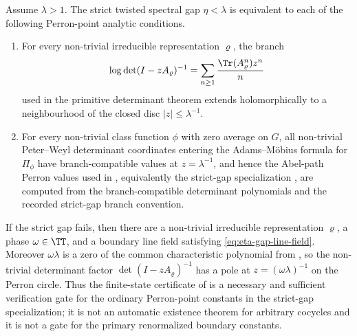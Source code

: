 \begin{proposition}
  \label{prop:eta-gap-perron-separation}
  Assume \(\lambda>1\).  The strict twisted spectral gap
  \(\eta<\lambda\) is equivalent to each of the following Perron-point
  analytic conditions.
  \begin{enumerate}[label=\textup{(\roman*)},leftmargin=*]
  \item For every non-trivial irreducible representation \(\varrho\), the
    branch
    \[
      \log\det(I-zA_\varrho)^{-1}
      =
      \sum_{n\ge1}\frac{\Tr(A_\varrho^n)z^n}{n}
    \]
    used in the primitive determinant theorem extends holomorphically to a neighbourhood of
    the closed disc \(|z|\le\lambda^{-1}\).
  \item For every non-trivial class function \(\phi\) with zero average on
    \(G\), all non-trivial Peter--Weyl determinant coordinates entering the
    Adams--M\"obius formula for \(\Pi_\phi\) have branch-compatible values at
    \(z=\lambda^{-1}\), and hence the Abel-path Perron values used in
    , equivalently the
    strict-gap specialization , are
    computed from the branch-compatible determinant polynomials and the
    recorded strict-gap branch convention.
  \end{enumerate}
  If the strict gap fails, then there are a non-trivial irreducible
  representation \(\varrho\), a phase \(\omega\in\TT\), and a boundary line
  field satisfying \eqref{eq:eta-gap-line-field}.  Moreover
  \(\omega\lambda\) is a zero of the common characteristic polynomial from
  , so the non-trivial
  determinant factor \(\det(I-zA_\varrho)^{-1}\) has a pole at
  \(z=(\omega\lambda)^{-1}\) on the Perron circle.  Thus the finite-state
  certificate of  is a necessary
  and sufficient verification gate for the ordinary Perron-point constants in
  the strict-gap specialization; it is not an automatic existence theorem for
  arbitrary cocycles and it is not a gate for the primary renormalized
  boundary constants.
\end{proposition}

